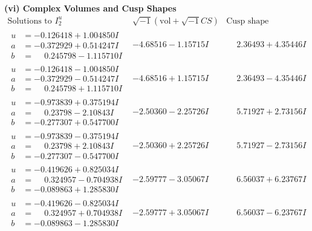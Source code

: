 \documentclass[1p]{elsarticle_modified}
\theoremstyle{definition}
\newcommand{\I}{\sqrt{-1}}
\begin{document}
\newpage\flushleft \textbf{(vi) Complex Volumes and Cusp Shapes}
$$\begin{array}{c|c|c}  
\text{Solutions to }I^u_{2}& \I (\text{vol} + \sqrt{-1}CS) & \text{Cusp shape}\\
 \hline 
\begin{aligned}
u &= -0.126418 + 1.004850 I \\
a &= -0.372929 + 0.514247 I \\
b &= \phantom{-}0.245798 - 1.115710 I\end{aligned}
 & -4.68516 - 1.15715 I & \phantom{-}2.36493 + 4.35446 I \\ \hline\begin{aligned}
u &= -0.126418 - 1.004850 I \\
a &= -0.372929 - 0.514247 I \\
b &= \phantom{-}0.245798 + 1.115710 I\end{aligned}
 & -4.68516 + 1.15715 I & \phantom{-}2.36493 - 4.35446 I \\ \hline\begin{aligned}
u &= -0.973839 + 0.375194 I \\
a &= \phantom{-}0.23798 - 2.10843 I \\
b &= -0.277307 + 0.547700 I\end{aligned}
 & -2.50360 - 2.25726 I & \phantom{-}5.71927 + 2.73156 I \\ \hline\begin{aligned}
u &= -0.973839 - 0.375194 I \\
a &= \phantom{-}0.23798 + 2.10843 I \\
b &= -0.277307 - 0.547700 I\end{aligned}
 & -2.50360 + 2.25726 I & \phantom{-}5.71927 - 2.73156 I \\ \hline\begin{aligned}
u &= -0.419626 + 0.825034 I \\
a &= \phantom{-}0.324957 - 0.704938 I \\
b &= -0.089863 + 1.285830 I\end{aligned}
 & -2.59777 - 3.05067 I & \phantom{-}6.56037 + 6.23767 I \\ \hline\begin{aligned}
u &= -0.419626 - 0.825034 I \\
a &= \phantom{-}0.324957 + 0.704938 I \\
b &= -0.089863 - 1.285830 I\end{aligned}
 & -2.59777 + 3.05067 I & \phantom{-}6.56037 - 6.23767 I \\ \hline\begin{aligned}

\end{aligned}
\end{array}$$
\end{document}
